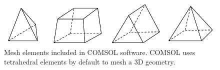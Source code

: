 \begin{figure}[ht]
	\includegraphics[width=\textwidth]{03_Prototype/figures/00_fig/fig006_COMSOL_meshing_elements.png}
	\caption[3D Mesh elements included in COMSOL]{Mesh elements included in COMSOL software. COMSOL uses tetrahedral elements by default to mesh a 3D geometry.}
	\label{chap3:maxwell_gas_log1}
\end{figure}
